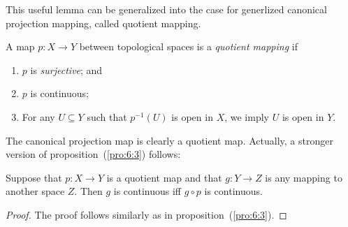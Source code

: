 \begin{remark}
This useful lemma can be generalized into the case for generlized canonical projection mapping, called quotient mapping.
\begin{definition}
A map $p:X\to Y$ between topological spaces is a \emph{quotient mapping} if
\begin{enumerate}
\item
$p$ is \emph{surjective}; and
\item
$p$ is continuous;
\item
For any $U\subseteq Y$ such that $p^{-1}(U)$ is open in $X$, we imply
$U$ is open in $Y$.
\end{enumerate}
\end{definition}
The canonical projection map is clearly a quotient map. Actually, a stronger version of proposition~(\ref{pro:6:3}) follows:
\begin{proposition}
Suppose that $p:X\to Y$ is a quotient map and that $g:Y\to Z$ is any mapping to another space $Z$.
Then $g$ is continuous iff $g\circ p$ is continuous.
\end{proposition}
\begin{proof}
The proof follows similarly as in proposition~(\ref{pro:6:3}).
\end{proof}
\end{remark}

